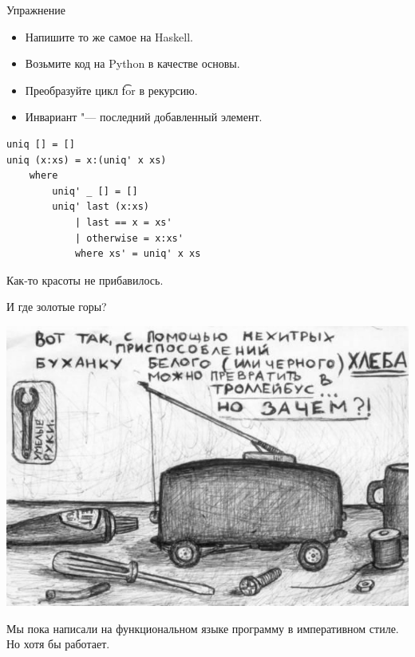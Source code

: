 \begin{frame}[t, fragile]{Упражнение}
	\begin{itemize}
		\item Напишите то же самое на Haskell.
		\item Возьмите код на Python в качестве основы.
		\item Преобразуйте цикл \t{for} в рекурсию. \pause
		\item Инвариант "--- последний добавленный элемент.
	\end{itemize}
	\pause
\begin{verbatim}
uniq [] = []
uniq (x:xs) = x:(uniq' x xs)
    where
        uniq' _ [] = []
        uniq' last (x:xs)
            | last == x = xs'
            | otherwise = x:xs'
            where xs' = uniq' x xs
\end{verbatim}
	Как-то красоты не прибавилось.
\end{frame}

\begin{frame}{И где золотые горы?}
	\begin{center}
		\includegraphics[scale=0.35]{bread-why.jpg}
	\end{center}
	Мы пока написали на функциональном языке программу в императивном стиле.
	Но хотя бы работает.
\end{frame}

